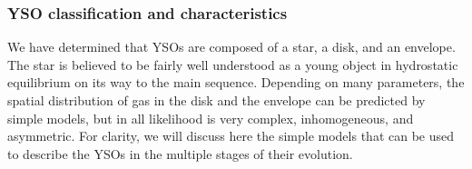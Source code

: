 








\subsubsection{YSO classification and characteristics}

We have determined that YSOs are composed of a star, a disk, and an envelope. The star is believed to be fairly well understood as a young object in hydrostatic equilibrium on its way to the main sequence. Depending on many parameters, the spatial distribution of gas in the disk and the envelope can be predicted by simple models, but in all likelihood is very complex, inhomogeneous, and asymmetric. 
For clarity, we will discuss here the simple models that can be used to describe the YSOs in the multiple stages of their evolution.

